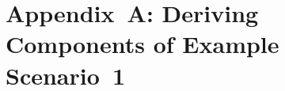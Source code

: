 \documentclass[12pt, draftclsnofoot, onecolumn]{IEEEtran}
\begin{document}

\allowdisplaybreaks
\section*{Appendix~A: Deriving Components of Example Scenario~1}
\end{document}
